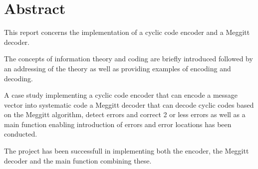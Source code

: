 \documentclass[Main]{subfiles}
\begin{document}
\section{Abstract}

This report concerns the implementation of a cyclic code encoder and a Meggitt decoder. 

The concepts of information theory and coding are briefly introduced followed by an addressing of the theory as well as providing examples of encoding and decoding. 

A case study implementing a cyclic code encoder that can encode a message vector into systematic code a Meggitt decoder that can decode cyclic codes based on the Meggitt algorithm, detect errors and correct 2 or less errors as well as a main function enabling introduction of errors and error locations has been conducted. 

The project has been successfull in implementing both the encoder, the Meggitt decoder and the main function combining these.
\end{document}
